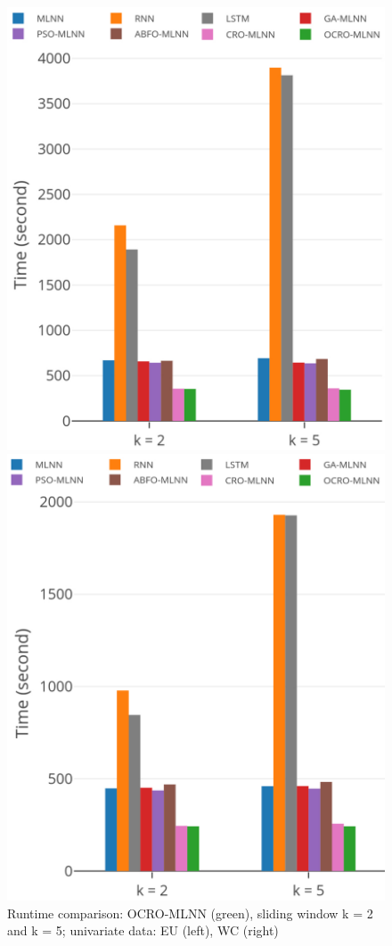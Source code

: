 \documentclass[review,3p,authoryear]{elsarticle}
\begin{document}
{\begin{figure}
	\centering
	\begin{minipage}[t]{8cm}
		\centering
		\includegraphics[width=0.8\textwidth =0cm 0cm 0cm 0cm]{images/pdf/time/time_eu.pdf}
	\end{minipage}
	\begin{minipage}[t]{8cm}
		\centering
		\includegraphics[width=0.8\textwidth =0cm 0cm 0cm 0cm]{images/pdf/time/time_wc.pdf}
	\end{minipage}
	\caption{Runtime comparison: OCRO-MLNN (green), sliding window k = 2 and k = 5; univariate data: EU (left), WC (right)} 
	\label{fig:speed_system_univariate}
\end{figure}

}
\end{document}
